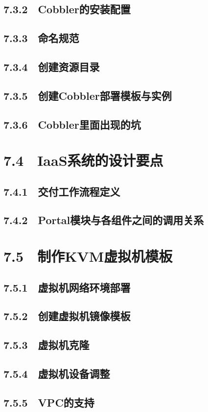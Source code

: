 \documentclass[12pt,UTF8]{ctexbook}
\begin{document}
{\subsection{7.3.2　Cobbler的安装配置}
\subsection{7.3.3　命名规范}
\subsection{7.3.4　创建资源目录}
\subsection{7.3.5　创建Cobbler部署模板与实例}
\subsection{7.3.6　Cobbler里面出现的坑}
\section{7.4　IaaS系统的设计要点}
\subsection{7.4.1　交付工作流程定义}
\subsection{7.4.2　Portal模块与各组件之间的调用关系}
\section{7.5　制作KVM虚拟机模板}
\subsection{7.5.1　虚拟机网络环境部署}
\subsection{7.5.2　创建虚拟机镜像模板}
\subsection{7.5.3　虚拟机克隆}
\subsection{7.5.4　虚拟机设备调整}
\subsection{7.5.5　VPC的支持}
}
\end{document}
